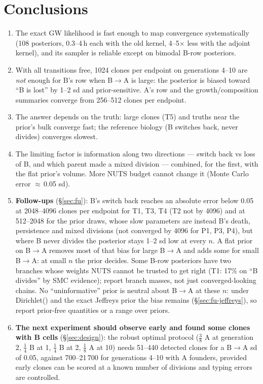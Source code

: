 \documentclass[10pt,a4paper]{article}
\newcommand{\BA}{B$\to$A}
\begin{document}
\section{Conclusions}\label{sec:conclusions}
\begin{enumerate}
\item The exact GW likelihood is fast enough to map convergence systematically (108 posteriors, 0.3--4\,h each with the old kernel, 4--5$\times$ less with the adjoint kernel), and its sampler is reliable except on bimodal B-row posteriors.
\item With all transitions free, 1024 clones per endpoint on generations 4--10 are \emph{not} enough for B's row when \BA{} is large: the posterior is biased toward ``B is lost'' by 1--2 sd and prior-sensitive. A's row and the growth/composition summaries converge from 256--512 clones per endpoint.
\item The answer depends on the truth: large clones (T5) and truths near the prior's bulk converge fast; the reference biology (B switches back, never divides) converges slowest.
\item The limiting factor is information along two directions --- switch back vs loss of B, and which parent made a mixed division --- combined, for the first, with the flat prior's volume. More NUTS budget cannot change it (Monte Carlo error $\approx$\,0.05 sd).
\item \textbf{Follow-ups} (\S\ref{sec:fu}): B's switch back reaches an absolute error below 0.05 at 2048--4096 clones per endpoint for T1, T3, T4 (T2 not by 4096) and at 512--2048 for the prior draws, whose slow parameters are instead B's death, persistence and mixed divisions (not converged by 4096 for P1, P3, P4), but where B never divides the posterior stays 1--2 sd low at every $n$. A flat prior on \BA{} removes most of that bias for large \BA{} and adds some for small \BA: at small $n$ the prior decides. Some B-row posteriors have two branches whose weights NUTS cannot be trusted to get right (T1: 17\% on ``B divides'' by SMC evidence); report branch masses, not just converged-looking chains. No ``uninformative'' prior is neutral about \BA{} at these $n$: under Dirichlet(\textonehalf) and the exact Jeffreys prior the bias remains (\S\ref{sec:fu-jeffreys}), so report prior-free quantities or a range over priors.
\item \textbf{The next experiment should observe early and found some clones with B cells} (\S\ref{sec:design}): the robust optimal protocol ($\tfrac38$ A at generation 2, $\tfrac14$ B at 1, $\tfrac14$ B at 2, $\tfrac18$ A at 10) needs 51--440 detected clones for a \BA{} sd of 0.05, against 700--21\,700 for generations 4--10 with A founders, provided early clones can be scored at a known number of divisions and typing errors are controlled.

\end{enumerate}
\end{document}

